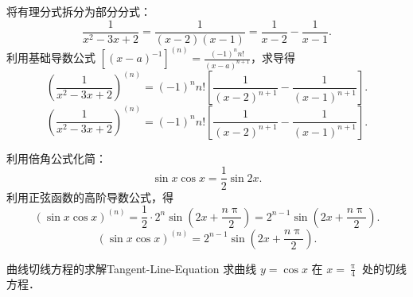 \begin{solution}

    将有理分式拆分为部分分式：
    \begin{equation}
        \frac{1}{x^2 - 3x + 2} = \frac{1}{(x-2)(x-1)} = \frac{1}{x-2} - \frac{1}{x-1}.
    \end{equation}
    利用基础导数公式 $[(x-a)^{-1}]^{(n)} = \frac{(-1)^n n!}{(x-a)^{n+1}}$，求导得
    \begin{equation}
        \left( \frac{1}{x^2 - 3x + 2} \right)^{(n)} = (-1)^n n! \left[ \frac{1}{(x-2)^{n+1}} - \frac{1}{(x-1)^{n+1}} \right].
    \end{equation}
    \begin{equation}
        \boxed{\left( \frac{1}{x^2 - 3x + 2} \right)^{(n)} = (-1)^n n! \left[ \frac{1}{(x-2)^{n+1}} - \frac{1}{(x-1)^{n+1}} \right].}
    \end{equation}


    利用倍角公式化简：
    \begin{equation}
        \sin x \cos x = \frac{1}{2}\sin 2x.
    \end{equation}
    利用正弦函数的高阶导数公式，得
    \begin{equation}
        (\sin x \cos x)^{(n)} = \frac{1}{2} \cdot 2^n \sin\left(2x + \frac{n\uppi}{2}\right) = 2^{n-1} \sin\left(2x + \frac{n\uppi}{2}\right).
    \end{equation}
    \begin{equation}
        \boxed{(\sin x \cos x)^{(n)} = 2^{n-1} \sin\left(2x + \frac{n\uppi}{2}\right).}
    \end{equation}
\end{solution}

\begin{problem}{曲线切线方程的求解}{Tangent-Line-Equation}
    求曲线 $y = \cos x$ 在 $x = \frac{\uppi}{4}$ 处的切线方程．
\end{problem}

